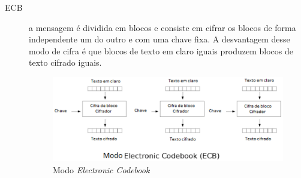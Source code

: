 \begin{description}
\item [ECB] a mensagem é dividida em blocos e consiste em cifrar os blocos de forma independente um do outro e com uma chave fixa. A desvantagem desse modo de cifra é que blocos de texto em claro iguais produzem blocos de texto cifrado iguais.
\begin{figure}[h]
\centering
\includegraphics[keepaspectratio=true,scale=0.8]
	{figuras/ecb.eps}
	\caption[Modo Electronic Codebook]{Modo \textit{Electronic Codebook}\protect\footnotemark}
	

\end{figure}
\end{description}
